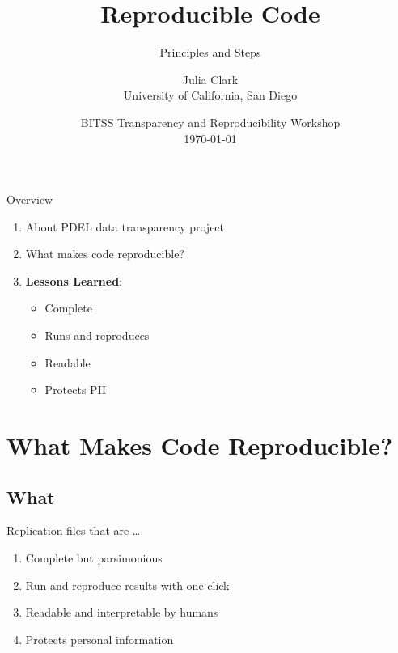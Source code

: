 \documentclass[12pt, compress]{beamer} %
\title[Short Title]{Reproducible Code}
\subtitle{Principles and Steps}
\author[Clark]{Julia Clark \\ University of California, San Diego}
\date[Short Occasion]{ BITSS Transparency and Reproducibility Workshop \\ \today}
\let\olditem\item %
\renewcommand{\item}{%
\olditem\vspace{\fill}}
\begin{document}

{ %
\frame{
  \titlepage
  \note{}
  }
}




	{ %
	\begin{frame}{Overview}
		\begin{enumerate}
			\item About PDEL data transparency project
			\item What makes code reproducible?
			\item \textbf{Lessons Learned}:
				\begin{itemize}
					\item Complete 
					\item Runs and reproduces
					\item Readable 
					\item Protects PII
				\end{itemize}
		\end{enumerate}
	\end{frame}
	}




\section{What Makes Code Reproducible?}

\subsection{What}
	\begin{frame}{Replication files that are \dots}
		\begin{enumerate}
			\item Complete but parsimonious
			\item Run and reproduce results with one click
			\item Readable and interpretable by humans
			\item Protects personal information
		\end{enumerate}
	\end{frame}
\end{document}

